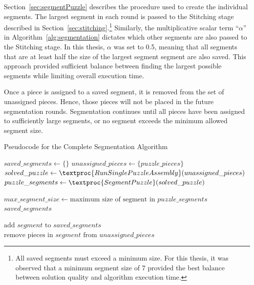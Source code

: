 Section~\ref{sec:segmentPuzzle} describes the procedure used to create the individual segments. The largest segment in each round is passed to the Stitching stage described in Section~\ref{sec:stitching}.\footnote{All saved segments must exceed a minimum size.  For this thesis, it was observed that a minimum segment size of 7 provided the best balance between solution quality and algorithm execution time.} Similarly, the multiplicative scalar term ``\textit{$\alpha$}'' in Algorithm~\ref{alg:segmentation} dictates which other segments are also passed to the Stitching stage.  In this thesis, \textit{$\alpha$} was set to 0.5, meaning that all segments that are at least half the size of the largest segment segment are also saved.  This approach provided sufficient balance between finding the largest possible segments while limiting overall execution time.

Once a piece is assigned to a saved segment, it is removed from the set of unassigned pieces.  Hence, those pieces will not be placed in the future segmentation rounds.  Segmentation continues until all pieces have been assigned to sufficiently large segments, or no segment exceeds the minimum allowed segment size.

\begin{algorithm}[tb]
\caption{Pseudocode for the Complete Segmentation Algorithm}\label{alg:segmentation}
\begin{algorithmic}[1]
    \State $saved\_segments \gets \{ \}$
    \State $unassigned\_pieces \gets \{ puzzle\_pieces \}$
    \Loop
        \State $solved\_puzzle \gets \textproc{RunSinglePuzzleAssembly}(unassigned\_pieces)$
        \State $puzzle\_segments \gets \textproc{SegmentPuzzle}(solved\_puzzle)$
\item[]
        \State $max\_segment\_size \gets \text{maximum size of segment in } puzzle\_segments$
			\State \Return $saved\_segments$
        \EndIf
\item[]
                \State $\text{add } segment \text{ to } saved\_segments$
                \State $\text{remove pieces in } segment \text{ from } unassigned\_pieces$
            \EndIf
        \EndFor
	\EndLoop
\EndFunction
\end{algorithmic}
\end{algorithm}

